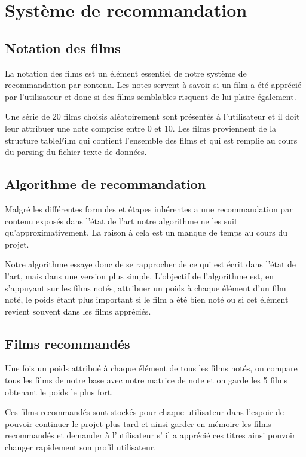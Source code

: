 \documentclass{article}
\begin{document}
\newpage





\section{Système de recommandation}
\subsection{Notation des films}
    La notation des films est un élément essentiel de notre système de recommandation par contenu. Les notes servent à savoir si un film a été apprécié par l'utilisateur et donc si des films semblables risquent de lui plaire également.
    \par Une série de 20 films choisis aléatoirement sont présentés à l'utilisateur et il doit leur attribuer une note comprise entre 0 et 10. Les films proviennent de la structure tableFilm qui contient l'ensemble des films et qui est remplie au cours du parsing du fichier texte de données.
\subsection{Algorithme de recommandation}
    Malgré les différentes formules et étapes inhérentes a une recommandation par contenu exposés dans l'état de l'art notre algorithme ne les suit qu'approximativement. La raison à cela est un manque de temps au cours du projet. 
    \par Notre algorithme essaye donc de se rapprocher de ce qui est écrit dans l'état de l'art, mais dans une version plus simple. L'objectif de l'algorithme est, en s'appuyant sur les films notés, attribuer un poids à chaque élément d'un film noté, le poids étant plus important si le film a été bien noté ou si cet élément revient souvent dans les films appréciés.
    
\subsection{Films recommandés}
    Une fois un poids attribué à chaque élément de tous les films notés, on compare tous les films de notre base avec notre matrice de note et on garde les 5 films obtenant le poids le plus fort.
    \par Ces films recommandés sont stockés pour chaque utilisateur dans l'espoir de pouvoir continuer le projet plus tard et ainsi garder en mémoire les films recommandés et demander à l'utilisateur s’ il a apprécié ces titres ainsi pouvoir changer rapidement son profil utilisateur.\\
    
\end{document}
